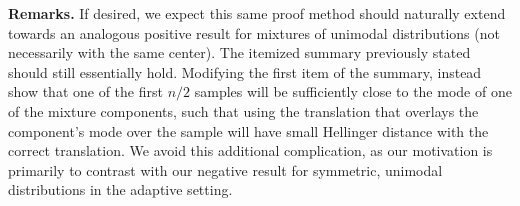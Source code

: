 \textbf{Remarks. } If desired, we expect this same proof method should naturally extend towards an analogous positive result for mixtures of unimodal distributions (not necessarily with the same center). The itemized summary previously stated should still essentially hold. Modifying the first item of the summary, instead show that one of the first $n/2$ samples will be sufficiently close to the mode of one of the mixture components, such that using the translation that overlays the component's mode over the sample will have small Hellinger distance with the correct translation. We avoid this additional complication,  as our motivation is primarily to contrast with our negative result for symmetric, unimodal distributions in the adaptive setting.
